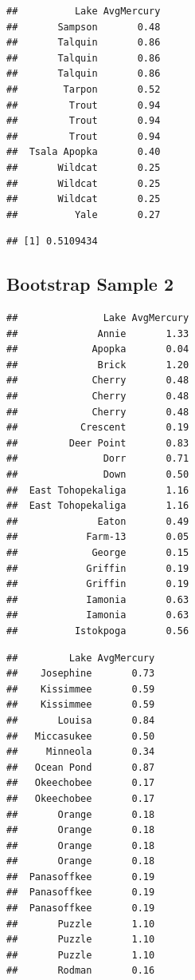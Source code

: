 \documentclass[]{book}
\newenvironment{Shaded}{\begin{snugshade}}{\end{snugshade}}
\newcommand{\KeywordTok}[1]{\textcolor[rgb]{0.13,0.29,0.53}{\textbf{#1}}}
\newcommand{\OperatorTok}[1]{\textcolor[rgb]{0.81,0.36,0.00}{\textbf{#1}}}
\newcommand{\NormalTok}[1]{#1}
\begin{document}
\begin{verbatim}
##          Lake AvgMercury
##       Sampson       0.48
##       Talquin       0.86
##       Talquin       0.86
##       Talquin       0.86
##        Tarpon       0.52
##         Trout       0.94
##         Trout       0.94
##         Trout       0.94
##  Tsala Apopka       0.40
##       Wildcat       0.25
##       Wildcat       0.25
##       Wildcat       0.25
##          Yale       0.27
\end{verbatim}

\begin{Shaded}
\end{Shaded}

\begin{verbatim}
## [1] 0.5109434
\end{verbatim}

\subsection{Bootstrap Sample 2}\label{bootstrap-sample-2}

\begin{verbatim}
##               Lake AvgMercury
##              Annie       1.33
##             Apopka       0.04
##              Brick       1.20
##             Cherry       0.48
##             Cherry       0.48
##             Cherry       0.48
##           Crescent       0.19
##         Deer Point       0.83
##               Dorr       0.71
##               Down       0.50
##  East Tohopekaliga       1.16
##  East Tohopekaliga       1.16
##              Eaton       0.49
##            Farm-13       0.05
##             George       0.15
##            Griffin       0.19
##            Griffin       0.19
##            Iamonia       0.63
##            Iamonia       0.63
##          Istokpoga       0.56
\end{verbatim}

\begin{verbatim}
##         Lake AvgMercury
##    Josephine       0.73
##    Kissimmee       0.59
##    Kissimmee       0.59
##       Louisa       0.84
##   Miccasukee       0.50
##     Minneola       0.34
##   Ocean Pond       0.87
##   Okeechobee       0.17
##   Okeechobee       0.17
##       Orange       0.18
##       Orange       0.18
##       Orange       0.18
##       Orange       0.18
##  Panasoffkee       0.19
##  Panasoffkee       0.19
##  Panasoffkee       0.19
##       Puzzle       1.10
##       Puzzle       1.10
##       Puzzle       1.10
##       Rodman       0.16
\end{verbatim}
\end{document}
